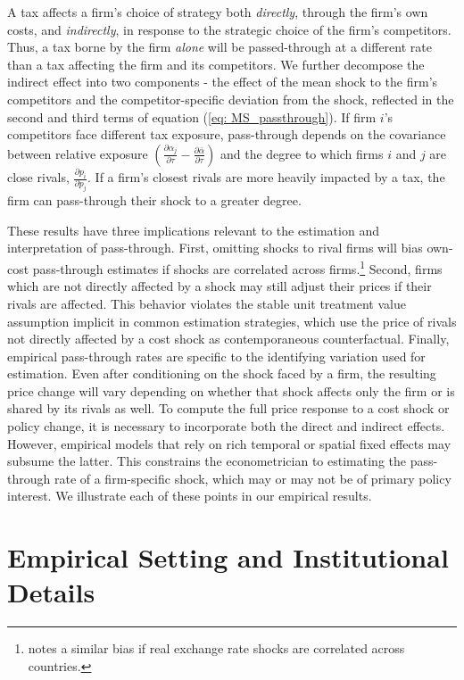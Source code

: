 \documentclass[12pt]{article}
\begin{document}
A tax affects a firm's choice of strategy both \textit{directly}, through the firm's own costs, and \textit{indirectly}, in response to the strategic choice of the firm's competitors. Thus, a tax borne by the firm \emph{alone} will be passed-through at a different rate than a tax affecting the firm and its competitors.  We further decompose the indirect effect into two components - the effect of the mean shock to the firm's competitors and the competitor-specific deviation from the shock, reflected in the second and third terms of equation (\ref{eq: MS_passthrough}).  If firm $i$'s competitors face different tax exposure, pass-through depends on the covariance between relative exposure $(\frac{\partial \alpha_j}{\partial \tau} - \frac{\partial \bar{\alpha}}{\partial \tau})$ and the degree to which firms $i$ and $j$ are close rivals, $\frac{\partial p_{i}}{\partial p_{j}}$.  If a firm's closest rivals are more heavily impacted by a tax, the firm can pass-through their shock to a greater degree.

These results have three implications relevant to the estimation and interpretation of pass-through. First, omitting shocks to rival firms will bias own-cost pass-through estimates if shocks are correlated across firms.\footnote{\citet{pennings2017pass} notes a similar bias if real exchange rate shocks are correlated across countries.} Second, firms which are not directly affected by a shock may still adjust their prices if their rivals are affected. This behavior violates the stable unit treatment value assumption implicit in common estimation strategies, which use the price of rivals not directly affected by a cost shock as contemporaneous counterfactual. Finally, empirical pass-through rates are specific to the identifying variation used for estimation. Even after conditioning on the shock faced by a firm, the resulting price change will vary depending on whether that shock affects only the firm or is shared by its rivals as well. To compute the full price response to a cost shock or policy change, it is necessary to incorporate both the direct and indirect effects. However, empirical models that rely on rich temporal or spatial fixed effects may subsume the latter.  This constrains the econometrician to estimating the pass-through rate of a firm-specific shock, which may or may not be of primary policy interest. We illustrate each of these points in our empirical results.

\section{Empirical Setting and Institutional Details \label{sec:Background}}
\end{document}
